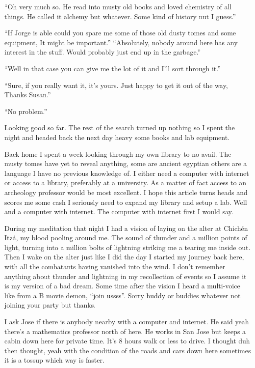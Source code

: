 ``Oh very much so. He read into musty old books and loved chemistry of all things. He called it alchemy but whatever. Some kind of history nut I guess.''

``If Jorge is able could you spare me some of those old dusty tomes and some equipment, It might be important.''
``Absolutely, nobody around here has any interest in the stuff. Would probably just end up in the garbage.''

``Well in that case you can give me the lot of it and I'll sort through it.''

``Sure, if you really want it, it's yours. Just happy to get it out of the way, Thanks Susan.''

``No problem.''

Looking good so far. The rest of the search turned up nothing so I spent the night and headed back the next day heavy some books and lab equipment.

Back home I spent a week looking through my own library to no avail. The musty tomes have yet to reveal anything, some are ancient egyptian others are a language I have no previous knowledge of. I either need a computer with internet or access to a library, preferably at a university. As a matter of fact access to an archeology professor would be most excellent. I hope this article turns heads and scores me some cash I seriously need to expand my library and setup a lab. Well and a computer with internet. The computer with internet first I would say.

During my meditation that night I had a vision of laying on the alter at Chich\'{e}n Itz\'{a}, my blood pooling around me. The sound of thunder and a million points of light, turning into a million bolts of lightning striking me a tearing me inside out. Then I wake on the alter just like I did the day I started my journey back here, with all the combatants having vanished into the wind. I don't remember anything about thunder and lightning in my recollection of events so I assume it is my version of a bad dream. Some time after the vision I heard a multi-voice like from a B movie demon, ``join ussss''. Sorry buddy or buddies whatever not joining your party but thanks.

I ask Jose if there is anybody nearby with a computer and internet. He said yeah there's a mathematics professor north of here. He works in San Jose but keeps a cabin down here for private time. It's 8 hours walk or less to drive. I thought duh then thought, yeah with the condition of the roads and cars down here sometimes it is a tossup which way is faster.

